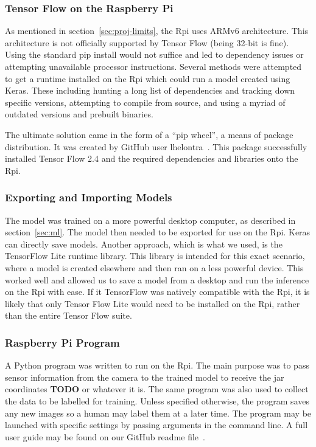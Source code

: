 \documentclass[11pt]{article}
\begin{document}
            \subsubsection{Tensor Flow on the Raspberry Pi}
                As mentioned in section~\ref{sec:proj-limits}, the Rpi uses ARMv6 architecture. This architecture is not officially supported by Tensor Flow (being 32-bit is fine). Using the standard pip install would not suffice and led to dependency issues or attempting unavailable processor instructions. Several methods were attempted to get a runtime installed on the Rpi which could run a model created using Keras. These including hunting a long list of dependencies and tracking down specific versions, attempting to compile from source, and using a myriad of outdated versions and prebuilt binaries. 
                
                The ultimate solution came in the form of a ``pip wheel'', a means of package distribution. It was created by GitHub user lhelontra~\cite{lontra}. This package successfully installed Tensor Flow 2.4 and the required dependencies and libraries onto the Rpi.

            \subsubsection{Exporting and Importing Models}
                The model was trained on a more powerful desktop computer, as described in section~\ref{sec:ml}. The model then needed to be exported for use on the Rpi. Keras can directly save models. Another approach, which is what we used, is the TensorFlow Lite runtime library. This library is intended for this exact scenario, where a model is created elsewhere and then ran on a less powerful device. This worked well and allowed us to save a model from a desktop and run the inference on the Rpi with ease. If it TensorFlow was natively compatible with the Rpi, it is likely that only Tensor Flow Lite would need to be installed on the Rpi, rather than the entire Tensor Flow suite.

            \subsubsection{Raspberry Pi Program}
                A Python program was written to run on the Rpi. The main purpose was to pass sensor information from the camera to the trained model to receive the jar coordinates \textbf{TODO} or whatever it is. The same program was also used to collect the data to be labelled for training. Unless specified otherwise, the program saves any new images so a human may label them at a later time. The program may be launched with specific settings by passing arguments in the command line. A full user guide may be found on our GitHub readme file~\cite{akkerman_hunter}.
\end{document}
